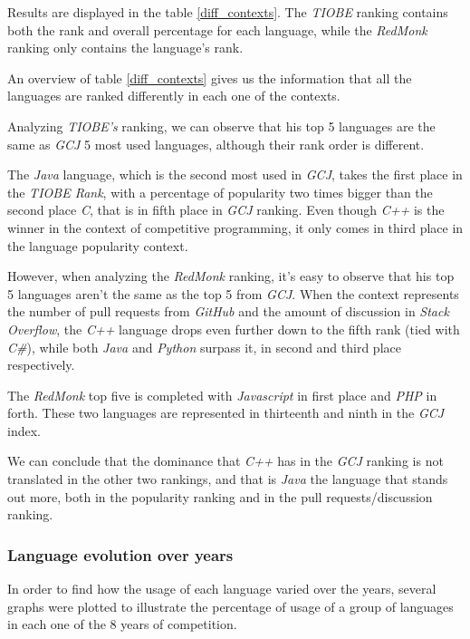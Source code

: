 \documentclass{article}
\begin{document}
\begin{multicols*}{2}
Results are displayed in the table \ref{diff_contexts}. The \textit{TIOBE} ranking contains both the rank and overall percentage for each language, while the \textit{RedMonk} ranking only contains the language's rank.

An overview of table \ref{diff_contexts} gives us the information that all the languages are ranked differently in each one of the contexts.


Analyzing \textit{TIOBE's} ranking, we can observe that his top 5 languages are the same as \textit{GCJ} 5 most used languages, although their rank order is different.

The \textit{Java} language, which is the second most used in \textit{GCJ}, takes the first place in the \textit{TIOBE Rank}, with a percentage of popularity two times bigger than the second place \textit{C}, that is in fifth place in \textit{GCJ} ranking. Even though \textit{C++} is the winner in the context of competitive programming, it only comes in third place in the language popularity context.


However, when analyzing the \textit{RedMonk} ranking, it's easy to observe that his top 5 languages aren't the same as the top 5 from \textit{GCJ}. When the context represents the number of pull requests from \textit{GitHub} and the amount of discussion in \textit{Stack Overflow}, the \textit{C++} language drops even further down to the fifth rank (tied with \textit{C\#}), while both \textit{Java} and \textit{Python} surpass it, in second and third place respectively.

The \textit{RedMonk} top five is completed with \textit{Javascript} in first place and \textit{PHP} in forth. These two languages are represented in thirteenth and ninth in the \textit{GCJ} index.

We can conclude that the dominance that \textit{C++} has in the \textit{GCJ} ranking is not translated in the other two rankings, and that is \textit{Java} the language that stands out more, both in the popularity ranking and in the pull requests/discussion ranking.


\subsubsection{Language evolution over years}

In order to find how the usage of each language varied over the years, several graphs were plotted to illustrate the percentage of usage of a group of languages in each one of the 8 years of competition.


\end{multicols*}
\end{document}

